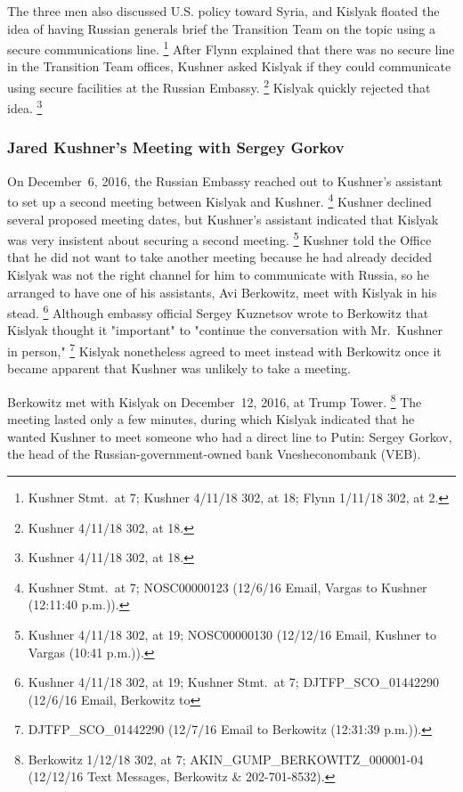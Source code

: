 The three men also discussed U.S. policy toward Syria, and Kislyak floated the idea of having Russian generals brief the Transition Team on the topic using a secure communications line.%
\footnote{Kushner Stmt.\ at 7;
Kushner 4/11/18 302, at 18;
Flynn 1/11/18 302, at 2.}
After Flynn explained that there was no secure line in the Transition Team offices, Kushner asked Kislyak if they could communicate using secure facilities at the Russian Embassy.%
\footnote{Kushner 4/11/18 302, at 18.}
Kislyak quickly rejected that idea.%
\footnote{Kushner 4/11/18 302, at 18.}

\subsubsection{Jared Kushner's Meeting with Sergey Gorkov}

On December~6, 2016, the Russian Embassy reached out to Kushner's assistant to set up a second meeting between Kislyak and Kushner.%
\footnote{Kushner Stmt.\ at 7;
NOSC00000123 (12/6/16 Email, Vargas to Kushner (12:11:40 p.m.)).}
Kushner declined several proposed meeting dates, but Kushner's assistant indicated that Kislyak was very insistent about securing a second meeting.%
\footnote{Kushner 4/11/18 302, at 19;
NOSC00000130 (12/12/16 Email, Kushner to Vargas (10:41 p.m.)).}
Kushner told the Office that he did not want to take another meeting because he had already decided Kislyak was not the right channel for him to communicate with Russia, so he arranged to have one of his assistants, Avi Berkowitz, meet with Kislyak in his stead.%
\footnote{Kushner 4/11/18 302, at 19;
Kushner Stmt.\ at 7;
DJTFP\_SCO\_01442290 (12/6/16 Email, Berkowitz to }
Although embassy official Sergey Kuznetsov wrote to Berkowitz that Kislyak thought it "important" to "continue the conversation with Mr.~Kushner in person,"%
\footnote{DJTFP\_SCO\_01442290 (12/7/16 Email  to Berkowitz (12:31:39 p.m.)).}
Kislyak nonetheless agreed to meet instead with Berkowitz once it became apparent that Kushner was unlikely to take a meeting.

Berkowitz met with Kislyak on December~12, 2016, at Trump Tower.%
\footnote{Berkowitz 1/12/18 302, at 7;
AKIN\_GUMP\_BERKOWITZ\_000001-04 (12/12/16 Text Messages, Berkowitz \& 202-701-8532).}
The meeting lasted only a few minutes, during which Kislyak indicated that he wanted Kushner to meet someone who had a direct line to Putin: Sergey Gorkov, the head of the Russian-government-owned bank Vnesheconombank (VEB).

